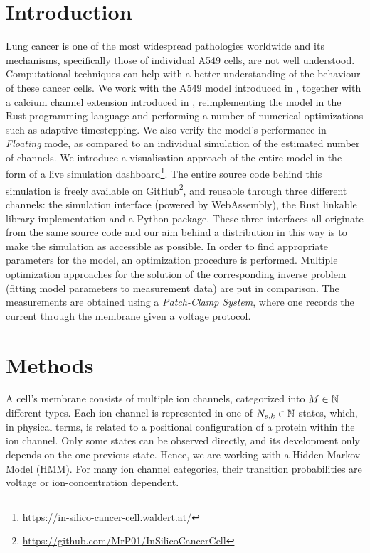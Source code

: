 \section{Introduction}
Lung cancer is one of the most widespread pathologies worldwide and its mechanisms, specifically those of individual A549 cells, are not well understood.
Computational techniques can help with a better understanding of the behaviour of these cancer cells.
We work with the A549 model introduced in \cite{2021-A549-model}, together with a calcium channel extension introduced in \cite{2024-calcium-channels}, reimplementing the model in the Rust programming language and performing a number of numerical optimizations such as adaptive timestepping.
We also verify the model's performance in \textit{Floating} mode, as compared to an individual simulation of the estimated number of channels.
We introduce a visualisation approach of the entire model in the form of a live simulation dashboard\footnote{\url{https://in-silico-cancer-cell.waldert.at/}}.
The entire source code behind this simulation is freely available on GitHub\footnote{\url{https://github.com/MrP01/InSilicoCancerCell}}, and reusable through three different channels: the simulation interface (powered by WebAssembly), the Rust linkable library implementation and a Python package.
These three interfaces all originate from the same source code and our aim behind a distribution in this way is to make the simulation as accessible as possible.
In order to find appropriate parameters for the model, an optimization procedure is performed.
Multiple optimization approaches for the solution of the corresponding inverse problem (fitting model parameters to measurement data) are put in comparison.
The measurements are obtained using a \textit{Patch-Clamp System}, where one records the current through the membrane given a voltage protocol.

\section{Methods}
A cell's membrane consists of multiple ion channels, categorized into $M \in \mathbb{N}$ different types.
Each ion channel is represented in one of $N_{s, k} \in \mathbb{N}$ states, which, in physical terms, is related to a positional configuration of a protein within the ion channel.
Only some states can be observed directly, and its development only depends on the one previous state.
Hence, we are working with a Hidden Markov Model (HMM).
For many ion channel categories, their transition probabilities are voltage or ion-concentration dependent.

